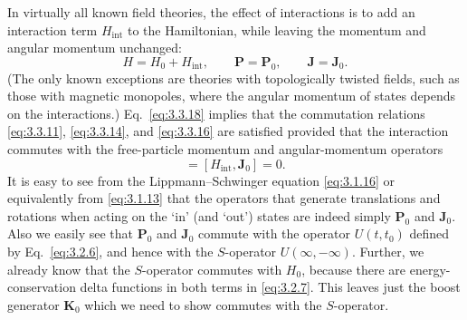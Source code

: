 In virtually all known field theories, the effect of interactions is to add an
interaction term $H_{\mathrm{int}}$ to the Hamiltonian, while leaving the momentum
and angular momentum unchanged:
\begin{equation}
H=H_0+H_{\mathrm{int}},\qquad \mathbf{P}=\mathbf{P}_0,\qquad
\mathbf{J}=\mathbf{J}_0.
\tag{3.3.18}\label{eq:3.3.18}
\end{equation}
(The only known exceptions are theories with topologically twisted fields, such as
those with magnetic monopoles, where the angular momentum of states depends on the
interactions.) Eq.~\eqref{eq:3.3.18} implies that the commutation relations \eqref{eq:3.3.11},
\eqref{eq:3.3.14}, and \eqref{eq:3.3.16} are satisfied provided that the interaction commutes with
the free-particle momentum and angular-momentum operators
\begin{equation}
[H_{\mathrm{int}},\mathbf{P}_0]=[H_{\mathrm{int}},\mathbf{J}_0]=0.
\tag{3.3.19}\label{eq:3.3.19}
\end{equation}
It is easy to see from the Lippmann--Schwinger equation \eqref{eq:3.1.16} or equivalently
from \eqref{eq:3.1.13} that the operators that generate translations and rotations when
acting on the `in' (and `out') states are indeed simply $\mathbf{P}_0$ and
$\mathbf{J}_0$. Also we easily see that $\mathbf{P}_0$ and $\mathbf{J}_0$ commute
with the operator $U(t,t_0)$ defined by Eq.~\eqref{eq:3.2.6}, and hence with the
$S$-operator $U(\infty,-\infty)$. Further, we already know that the $S$-operator
commutes with $H_0$, because there are energy-conservation delta functions in both
terms in \eqref{eq:3.2.7}. This leaves just the boost generator $\mathbf{K}_0$ which we need
to show commutes with the $S$-operator.

